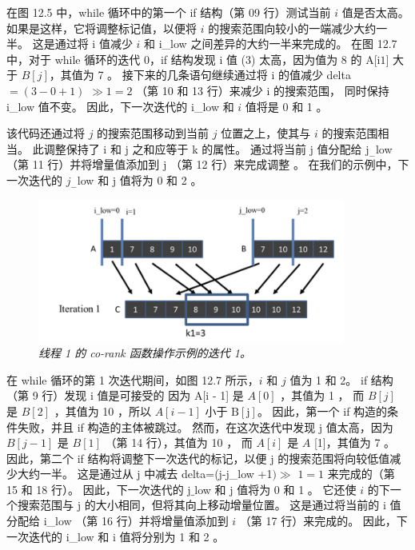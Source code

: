 在图 12.5 中，while 循环中的第一个 if 结构（第 09 行）测试当前 $i$ 值是否太高。 
如果是这样，它将调整标记值，以便将 $i$ 的搜索范围向较小的一端减少大约一半。 
这是通过将 i 值减少 $i$ 和 i\_low 之间差异的大约一半来完成的。 
在图 12.7 中，对于 while 循环的迭代 0，if 结构发现 i 值 (3) 太高，因为值为 8 的 A[i$1]$ 大于 $B[j ]$，其值为 7 。 
接下来的几条语句继续通过将 i 的值减少 delta $=(3-0+1)$ $\gg 1=2$ （第 10 和 13 行）来减少 i 的搜索范围，
同时保持 i\_low 值不变。 因此，下一次迭代的 i\_low 和 $i$ 值将是 0 和 1 。

该代码还通过将 $j$ 的搜索范围移动到当前 $j$ 位置之上，使其与 $i$ 的搜索范围相当。 
此调整保持了 $\mathrm{i}$ 和 $\mathrm{j}$ 之和应等于 $\mathrm{k}$ 的属性。 
通过将当前 $\mathrm{j}$ 值分配给 $\mathrm{j}_{-}$low （第 11 行）并将增量值添加到 $\mathrm{j}$ （第 12 行）来完成调整 。 在我们的示例中，下一次迭代的 $j_{-}$low 和 $\mathrm{j}$ 值将为 0 和 2 。

\begin{figure}[H]
	\centering
	\includegraphics[width=0.9\textwidth]{figs/F12.7.png}
	\caption{\textit{线程 1 的 co-rank 函数操作示例的迭代 1。}}
\end{figure}

在 while 循环的第 1 次迭代期间，如图 12.7 所示，$i$ 和 $j$ 值为 1 和 2。
if 结构（第 9 行）发现 $\mathrm{i}$ 值是可接受的 因为 $\mathrm{A}[\mathrm{i}$ - 1] 是 $A[0]$ ，其值为 1 ，
而 $B[j]$ 是 $B[2]$ ，其值为 10 ，所以 $ A[i-1]$ 小于 $\mathrm{B}[\mathrm{j}]$。 
因此，第一个 if 构造的条件失败，并且 if 构造的主体被跳过。 
然而，在这次迭代中发现 $\mathrm{j}$ 值太高，因为 $B[j-1]$ 是 $B[1]$ （第 14 行），其值为 10 ，
而 $A [i]$ 是 $A$ [1]，其值为 7 。 
因此，第二个 if 结构将调整下一次迭代的标记，以便 $\mathrm{j}$ 的搜索范围将向较低值减少大约一半。 
这是通过从 $\mathrm{j}$ 中减去 delta=(j-j\_low +1$) \gg$ $1=1$ 来完成的（第 15 和 18 行）。 
因此，下一次迭代的 $\mathrm{j} \_$low 和 $\mathrm{j}$ 值将为 0 和 1 。 
它还使 $i$ 的下一个搜索范围与 $\mathrm{j}$ 的大小相同，但将其向上移动增量位置。 
这是通过将当前的 $\mathrm{i}$ 值分配给 i\_low （第 16 行）并将增量值添加到 $i$ （第 17 行）来完成的。 
因此，下一次迭代的 i\_low 和 $\mathrm{i}$ 值将分别为 1 和 2 。

